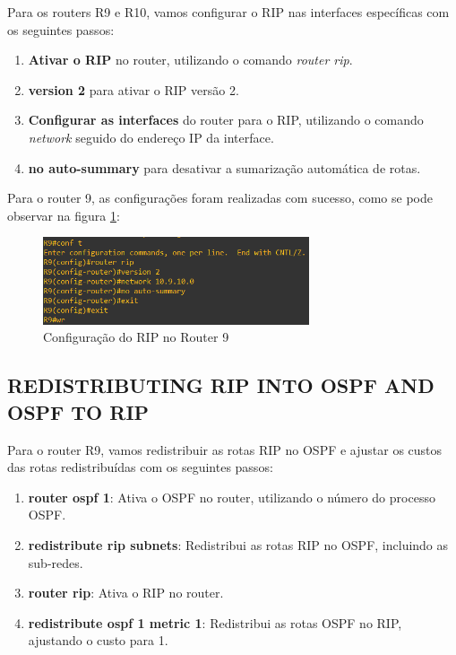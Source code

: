 \documentclass[11pt,english, openright, oneside]{book}
\begin{document}
Para os routers R9 e R10, vamos configurar o RIP nas interfaces específicas com os seguintes passos:
\vspace{0.2cm}

\begin{enumerate}
  \item \textbf{Ativar o RIP} no router, utilizando o comando \textit{router rip}.
  \item \textbf{version 2} para ativar o RIP versão 2.
  \item \textbf{Configurar as interfaces} do router para o RIP, utilizando o comando \textit{network} seguido do endereço IP da interface.
  \item \textbf{no auto-summary} para desativar a sumarização automática de rotas.
\end{enumerate}
\vspace{0.2cm}

Para o router 9, as configurações foram realizadas com sucesso, como se pode observar na figura \ref{fig:config31}:
\vspace{0.2cm}

\begin{figure}[H]
  \centering
  \includegraphics[width=0.70\textwidth]{imagens/Tarefa4/18.config_R9.png}
  \caption{Configuração do RIP no Router 9}
  \label{fig:config31}
\end{figure}
\vspace{0.2cm}

\subsection{REDISTRIBUTING RIP INTO OSPF AND OSPF TO RIP}
\vspace{0.2cm}

Para o router R9, vamos redistribuir as rotas RIP no OSPF e ajustar os custos das rotas redistribuídas com os seguintes passos:
\vspace{0.2cm}

\begin{enumerate}
  \item \textbf{router ospf 1}: Ativa o OSPF no router, utilizando o número do processo OSPF.
  \item \textbf{redistribute rip subnets}: Redistribui as rotas RIP no OSPF, incluindo as sub-redes.
  \item \textbf{router rip}: Ativa o RIP no router.
  \item \textbf{redistribute ospf 1 metric 1}: Redistribui as rotas OSPF no RIP, ajustando o custo para 1.
\end{enumerate}
\vspace{0.2cm}
\end{document}
